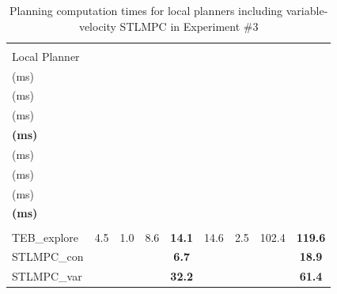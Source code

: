 \documentclass[journal]{IEEEtran}
\begin{document}
\begin{table}[ht]
\caption{Planning computation times for local planners including variable-velocity STLMPC in Experiment \#3}
\label{tab:STLMPCcomp5}
\vspace{-8pt}
\centering
\begin{tabular}{
    l@{\hskip 2.4pt}c@{\hskip 4.0pt}c@{\hskip 4.0pt}c@{\hskip 5.5pt}c@{\hskip 3.2pt}c@{\hskip 3.2pt}c@{\hskip 3.2pt}c@{\hskip 3.2pt}c
}
\toprule\\[-1.2em]
\scriptsize Local Planner &
\makecell{\scriptsize$\bar{t}_\textup{frn}$\\(ms)} &
\makecell{\scriptsize$\bar{t}_\textup{glb}$\\(ms)} &
\makecell{\scriptsize$\bar{t}_\textup{loc}$\\(ms)} &
\makecell{\scriptsize\bm{$\bar{t}_\textbf{comp}$}\\\textbf{(ms)}} &
\makecell{\scriptsize$\max t_\textup{frn}$\\(ms)} &
\makecell{\scriptsize$\max t_\textup{glb}$\\(ms)} &
\makecell{\scriptsize$\max t_\textup{loc}$\\(ms)} &
\makecell{\scriptsize$\bm{\max t_\textbf{comp}}$\\\textbf{(ms)}} \\
\midrule\\[-1.2em] 
{\scriptsize TEB\_explore} & 4.5 & 1.0 & 8.6 & \textbf{14.1} & 14.6 & 2.5 & 102.4 & \textbf{119.6}  \\
{\scriptsize STLMPC\_con} & \multicolumn{3}{c}{~~~} & \phantom{0}\textbf{6.7} & \multicolumn{3}{c}{~~~} & \phantom{0}\textbf{18.9}  \\
{\scriptsize STLMPC\_var} & \multicolumn{3}{c}{~~~} & \textbf{32.2} & \multicolumn{3}{c}{~~~} & \phantom{0}\textbf{61.4}  \\
\bottomrule
\end{tabular}
\end{table}
\end{document}
